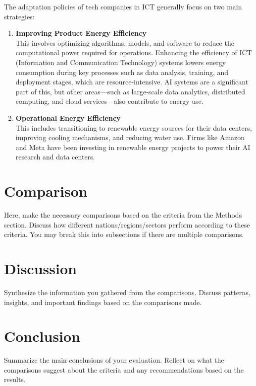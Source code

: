 \documentclass[12pt]{article}
\begin{document}
The adaptation policies of tech companies in ICT generally focus on two main strategies:
\begin{enumerate}
  \item \textbf{Improving Product Energy Efficiency} \\ This involves optimizing algorithms, models, and software to reduce the computational 
  power required for operations. Enhancing the efficiency of ICT (Information and Communication Technology) systems lowers energy consumption 
  during key processes such as data analysis, training, and deployment stages, which are resource-intensive. AI systems are a significant part 
  of this, but other areas—such as large-scale data analytics, distributed computing, and cloud services—also contribute to energy use.
  
  \item \textbf{Operational Energy Efficiency} \\ This includes transitioning to renewable energy sources for their data centers, 
  improving cooling mechanisms, and reducing water use. Firms like Amazon and Meta have been investing in renewable energy projects 
  to power their AI research and data centers.
\end{enumerate}




\section*{Comparison}
Here, make the necessary comparisons based on the criteria from the Methods section. Discuss how different nations/regions/sectors perform according to these criteria. You may break this into subsections if there are multiple comparisons.

\section*{Discussion}
Synthesize the information you gathered from the comparisons. Discuss patterns, insights, and important findings based on the comparisons made.

\section*{Conclusion}
Summarize the main conclusions of your evaluation. Reflect on what the comparisons suggest about the criteria and any recommendations based on the results.

\newpage
\printbibliography
\end{document}
